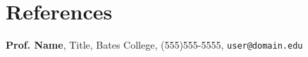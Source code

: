 \section{\sc References}

{\bf Prof. Name}, Title, Bates College, (555)555-5555, \texttt{user@domain.edu}\\

\endinput